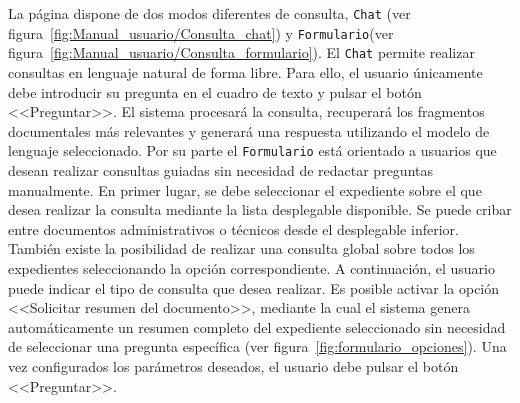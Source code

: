 La página dispone de dos modos diferentes de consulta, \texttt{Chat} (ver figura~\ref{fig:Manual_usuario/Consulta_chat}) y \texttt{Formulario}(ver figura~\ref{fig:Manual_usuario/Consulta_formulario}). El \texttt{Chat} permite realizar consultas en lenguaje natural de forma libre. Para ello, el usuario únicamente debe introducir su pregunta en el cuadro de texto y pulsar el botón <<Preguntar>>. El sistema procesará la consulta, recuperará los fragmentos documentales más relevantes y generará una respuesta utilizando el modelo de lenguaje seleccionado. Por su parte el \texttt{Formulario} está orientado a usuarios que desean realizar consultas guiadas sin necesidad de redactar preguntas manualmente. En primer lugar, se debe seleccionar el expediente sobre el que desea realizar la consulta mediante la lista desplegable disponible. Se puede cribar entre documentos administrativos o técnicos desde el desplegable inferior. También existe la posibilidad de realizar una consulta global sobre todos los expedientes seleccionando la opción correspondiente. A continuación, el usuario puede indicar el tipo de consulta que desea realizar. Es posible activar la opción <<Solicitar resumen del documento>>, mediante la cual el sistema genera automáticamente un resumen completo del expediente seleccionado sin necesidad de seleccionar una pregunta específica (ver figura~\ref{fig:formulario_opciones}). Una vez configurados los parámetros deseados, el usuario debe pulsar el botón <<Preguntar>>. 



